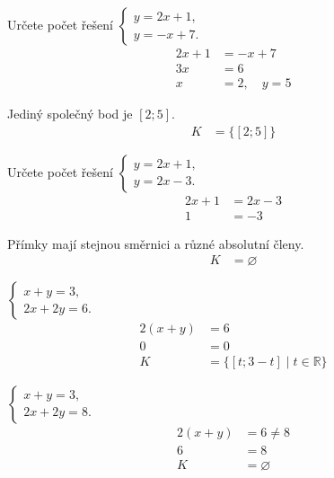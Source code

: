 \documentclass[11pt,a4paper]{article}
\begin{document}
\begin{prikladReseniBox}[title={Příklad 1}]
Určete počet řešení $\begin{cases}y=2x+1,\\y=-x+7.\end{cases}$
\tcblower
\[
\begin{aligned}
2x+1&=-x+7 \\
 3x&=6 \\
 x&=2,\quad y=5
\end{aligned}
\]

Jediný společný bod je $[2;5]$.
\[
\begin{aligned}
K &= \{[2;5]\}
\end{aligned}
\]
\end{prikladReseniBox}
\begin{prikladReseniBox}[title={Příklad 2}]
Určete počet řešení $\begin{cases}y=2x+1,\\y=2x-3.\end{cases}$
\tcblower
\[
\begin{aligned}
2x+1&=2x-3 \\
 1&=-3
\end{aligned}
\]

Přímky mají stejnou směrnici a různé absolutní členy.
\[
\begin{aligned}
K &= \varnothing
\end{aligned}
\]
\end{prikladReseniBox}
\begin{zadaniReseniBox}[title={Samostatná práce 1}]
$\begin{cases}x+y=3,\\2x+2y=6.\end{cases}$
\tcblower
\[
\begin{aligned}
2(x+y)&=6 \\
 0&=0 \\[2mm]
K &= \{[t;3-t]\mid t\in\mathbb R\}
\end{aligned}
\]
\end{zadaniReseniBox}
\begin{zadaniReseniBox}[title={Samostatná práce 2}]
$\begin{cases}x+y=3,\\2x+2y=8.\end{cases}$
\tcblower
\[
\begin{aligned}
2(x+y)&=6\ne8 \\
 6&=8 \\[2mm]
K &= \varnothing
\end{aligned}
\]
\end{zadaniReseniBox}
\end{document}
